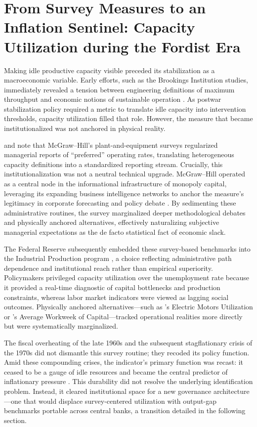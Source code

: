 \section{From Survey Measures to an Inflation Sentinel: Capacity Utilization during the Fordist Era}

Making idle productive capacity visible preceded its stabilization as a macroeconomic variable. Early efforts, such as the \citet{Nourse1934} Brookings Institution studies, immediately revealed a tension between engineering definitions of maximum throughput and economic notions of sustainable operation \citep{Burns1954; KleinDavid1958}. As postwar stabilization policy required a metric to translate idle capacity into intervention thresholds, capacity utilization filled that role. However, the measure that became institutionalized was not anchored in physical reality.

\citet{Butler1958} and \citet{Phillips1963} note that McGraw--Hill's plant-and-equipment surveys regularized managerial reports of ``preferred'' operating rates, translating heterogeneous capacity definitions into a standardized reporting stream. Crucially, this institutionalization was not a neutral technical upgrade. McGraw--Hill operated as a central node in the informational infrastructure of monopoly capital, leveraging its expanding business intelligence networks to anchor the measure’s legitimacy in corporate forecasting and policy debate \citep{BaranSweezy1988; Munroe2007}. By sedimenting these administrative routines, the survey marginalized deeper methodological debates and physically anchored alternatives, effectively naturalizing subjective managerial expectations as the de facto statistical fact of economic slack.

The Federal Reserve subsequently embedded these survey-based benchmarks into the Industrial Production program \citep{Board2017}, a choice reflecting administrative path dependence and institutional reach rather than empirical superiority. Policymakers privileged capacity utilization over the unemployment rate because it provided a real-time diagnostic of capital bottlenecks and production constraints, whereas labor market indicators were viewed as lagging social outcomes. Physically anchored alternatives---such as \citet{Foss1963}'s Electric Motors Utilization or \citet{TaubmanGottschalk1971}'s Average Workweek of Capital---tracked operational realities more directly but were systematically marginalized. 

The fiscal overheating of the late 1960s and the subsequent stagflationary crisis of the 1970s did not dismantle this survey routine; they recoded its policy function. Amid these compounding crises, the indicator's primary function was recast: it ceased to be a gauge of idle resources and became the central predictor of inflationary pressure \citep{KleinEtAl1973}. This durability did not resolve the underlying identification problem. Instead, it cleared institutional space for a new governance architecture---one that would displace survey-centered utilization with output-gap benchmarks portable across central banks, a transition detailed in the following section.

